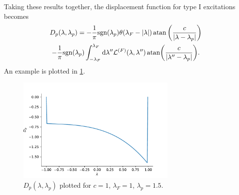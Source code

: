 \documentclass[11pt, a4paper]{report} %
\begin{document}
Taking these results together, the displacement function for type I excitations becomes 
\begin{multline}
	D_p(\lambda, \lambda_p) = - \frac{1}{\pi} \textrm{sgn}(\lambda_p) \theta(\lambda_F - \abs{\lambda})  \atan\left(\frac{c}{\abs{\lambda-\lambda_p}}\right) \\-\frac{1}{\pi}\textrm{sgn}(\lambda_p) \int_{-\lambda_F}^{\lambda_F} \dd \lambda''   \mathcal{L}^{(F)}(\lambda,\lambda'') \atan(\frac{c}{\abs{\lambda''-\lambda_p}}).
\end{multline}
An example is plotted in \cref{fig:dpplot}.
\begin{figure}[tb!]
  \centering
  \includegraphics[width=0.7\textwidth]{dpplot.pdf}
  \caption{$D_p(\lambda,\lambda_p)$ plotted for \(c=1\), \(\lambda_F=1\), \(\lambda_p=1.5\).}
  \label{fig:dpplot}
\end{figure}
\end{document}
